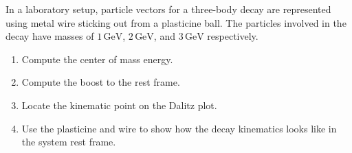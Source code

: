 In a laboratory setup, particle vectors for a three-body decay are represented using metal wire sticking out from a plasticine ball.
The particles involved in the decay have masses of $1\,\text{GeV}$, $2\,\text{GeV}$, and $3\,\text{GeV}$ respectively.

\begin{enumerate}
    \item Compute the center of mass energy.
    \item Compute the boost to the rest frame.
    \item Locate the kinematic point on the Dalitz plot.
    \item Use the plasticine and wire to show how the decay kinematics looks like in the system rest frame.
\end{enumerate}

